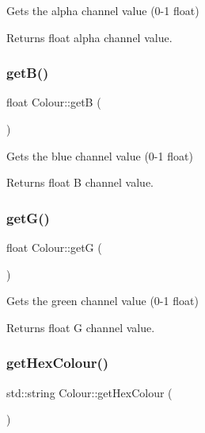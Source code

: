 Gets the alpha channel value (0-\/1 float) 

\begin{DoxyReturn}{Returns}
float alpha channel value. 
\end{DoxyReturn}
\mbox{\label{classColour_a9be696d70131487b8c2c4d92e09d5c8e}} 
\subsubsection{\texorpdfstring{get\+B()}{getB()}}
{\footnotesize\ttfamily float Colour\+::getB (\begin{DoxyParamCaption}{ }\end{DoxyParamCaption})\hspace{0.3cm}{\ttfamily [inline]}}



Gets the blue channel value (0-\/1 float) 

\begin{DoxyReturn}{Returns}
float B channel value. 
\end{DoxyReturn}
\mbox{\label{classColour_aa16d7328c2acc3d701fd39593be50a65}} 
\subsubsection{\texorpdfstring{get\+G()}{getG()}}
{\footnotesize\ttfamily float Colour\+::getG (\begin{DoxyParamCaption}{ }\end{DoxyParamCaption})\hspace{0.3cm}{\ttfamily [inline]}}



Gets the green channel value (0-\/1 float) 

\begin{DoxyReturn}{Returns}
float G channel value. 
\end{DoxyReturn}
\mbox{\label{classColour_a7f0220a8b5a1a0b476a1dc8f305484f7}} 
\subsubsection{\texorpdfstring{get\+Hex\+Colour()}{getHexColour()}}
{\footnotesize\ttfamily std\+::string Colour\+::get\+Hex\+Colour (\begin{DoxyParamCaption}{ }\end{DoxyParamCaption})\hspace{0.3cm}{\ttfamily [inline]}}



